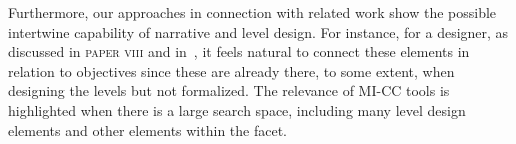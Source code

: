 Furthermore, our approaches in connection with related work show the possible intertwine capability of narrative and level design. For instance, for a designer, as discussed in \textsc{paper viii} and in~\cite{larsson_queststories_2021}, it feels natural to connect these elements in relation to objectives since these are already there, to some extent, when designing the levels but not formalized. The relevance of MI-CC tools is highlighted when there is a large search space, including many level design elements and other elements within the facet.










